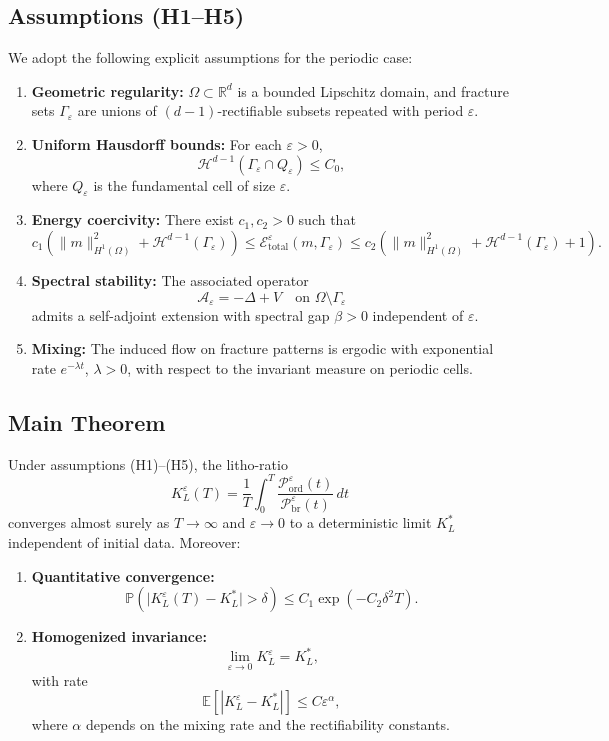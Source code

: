 \subsection*{Assumptions (H1--H5)}
We adopt the following explicit assumptions for the periodic case:
\begin{enumerate}[label=H\arabic*]
  \item \textbf{Geometric regularity:} $\Omega \subset \mathbb{R}^d$ is a bounded Lipschitz domain,
  and fracture sets $\Gamma_\varepsilon$ are unions of $(d-1)$-rectifiable subsets repeated 
  with period $\varepsilon$.
  \item \textbf{Uniform Hausdorff bounds:} For each $\varepsilon > 0$,
  \[
  \mathcal{H}^{d-1}(\Gamma_\varepsilon \cap Q_\varepsilon) \leq C_0,
  \]
  where $Q_\varepsilon$ is the fundamental cell of size $\varepsilon$.
  \item \textbf{Energy coercivity:} There exist $c_1,c_2>0$ such that
  \[
  c_1(\|m\|_{H^1(\Omega)}^2 + \mathcal{H}^{d-1}(\Gamma_\varepsilon)) 
  \leq \mathcal{E}_{\mathrm{total}}^\varepsilon(m,\Gamma_\varepsilon) 
  \leq c_2(\|m\|_{H^1(\Omega)}^2 + \mathcal{H}^{d-1}(\Gamma_\varepsilon) + 1).
  \]
  \item \textbf{Spectral stability:} The associated operator
  \[
  \mathcal{A}_\varepsilon = -\Delta + V \quad \text{on } \Omega \setminus \Gamma_\varepsilon
  \]
  admits a self-adjoint extension with spectral gap $\beta>0$ independent of $\varepsilon$.
  \item \textbf{Mixing:} The induced flow on fracture patterns is ergodic with 
  exponential rate $e^{-\lambda t}$, $\lambda>0$, with respect to the invariant measure 
  on periodic cells.
\end{enumerate}

\subsection*{Main Theorem}
\begin{theorem}
\label{thm:periodic-ergodic}
Under assumptions (H1)--(H5), the litho-ratio
\[
K_L^\varepsilon(T) = \frac{1}{T} \int_0^T 
\frac{\mathcal{P}_{\mathrm{ord}}^\varepsilon(t)}{\mathcal{P}_{\mathrm{br}}^\varepsilon(t)}\, dt
\]
converges almost surely as $T \to \infty$ and $\varepsilon \to 0$ to a deterministic limit $K_L^*$ 
independent of initial data. Moreover:
\begin{enumerate}[label=(\roman*)]
  \item \textbf{Quantitative convergence:}
  \[
  \mathbb{P}\left(\big|K_L^\varepsilon(T) - K_L^*\big| > \delta \right) 
  \leq C_1 \exp(-C_2 \delta^2 T).
  \]
  \item \textbf{Homogenized invariance:}
  \[
  \lim_{\varepsilon \to 0} K_L^\varepsilon = K_L^*,
  \]
  with rate
  \[
  \mathbb{E}[|K_L^\varepsilon - K_L^*|] \leq C \varepsilon^\alpha,
  \]
  where $\alpha$ depends on the mixing rate and the rectifiability constants.
\end{enumerate}
\end{theorem}

